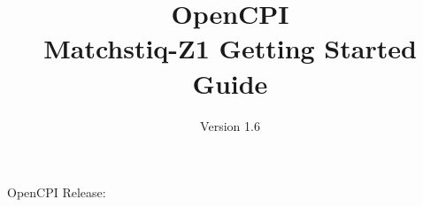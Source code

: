 \def\docTitle{OpenCPI\\ \bigskip Matchstiq-Z1 Getting Started Guide}
\def\docVersion{1.6}
\def\rccplatform{xilinx13\_3}
\def\radioName{Matchstiq-Z1}
\def\mountPoint{/mnt/}
\def\copyLoc{ATLAS}
\def\snippetpath{../../../../../../doc/av/tex/snippets}



\date{Version \docVersion} %
\title{\docTitle}
\usepackage[T1]{fontenc} %
\usepackage{graphicx}
\graphicspath{ {figures/} }
\usepackage{textcomp}

\maketitle
\begin{center}
OpenCPI Release: \ocpiversion
\end{center}

